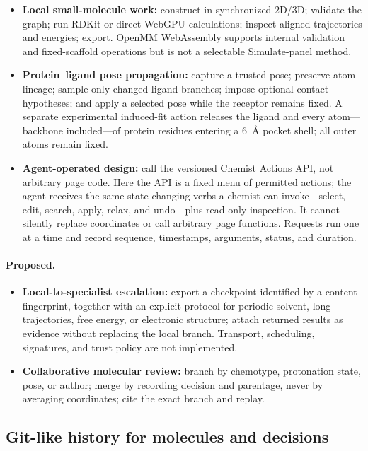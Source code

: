\begin{itemize}
  \item \textbf{Local small-molecule work:} construct in synchronized 2D/3D;
    validate the graph; run RDKit or direct-WebGPU calculations; inspect aligned
    trajectories and energies; export. OpenMM WebAssembly supports internal
    validation and fixed-scaffold operations but is not a selectable Simulate-panel
    method.
  \item \textbf{Protein--ligand pose propagation:} capture a trusted pose;
    preserve atom lineage; sample only changed ligand branches; impose optional
    contact hypotheses; and apply a selected pose while the receptor remains
    fixed. A separate experimental induced-fit action releases the ligand and
    every atom---backbone included---of protein residues entering a 6~\AA{}
    pocket shell; all outer atoms remain fixed.
  \item \textbf{Agent-operated design:} call the versioned Chemist Actions API,
    not arbitrary page code. Here the API is a fixed menu of permitted actions;
    the agent receives the same state-changing verbs a chemist can invoke---select,
    edit, search, apply, relax, and undo---plus read-only inspection. It cannot
    silently replace coordinates or call arbitrary page functions. Requests run
    one at a time and record sequence, timestamps, arguments, status, and duration.
\end{itemize}

\paragraph{Proposed.}

\begin{itemize}
  \item \textbf{Local-to-specialist escalation:} export a checkpoint identified
    by a content fingerprint, together with an explicit protocol for periodic
    solvent, long trajectories,
    free energy, or electronic structure; attach returned results as evidence
    without replacing the local branch. Transport, scheduling, signatures, and
    trust policy are not implemented.
  \item \textbf{Collaborative molecular review:} branch by chemotype,
    protonation state, pose, or author; merge by recording decision and
    parentage, never by averaging coordinates; cite the exact branch and replay.
\end{itemize}

\subsection{Git-like history for molecules and decisions}
\label{app:molecular-git}

